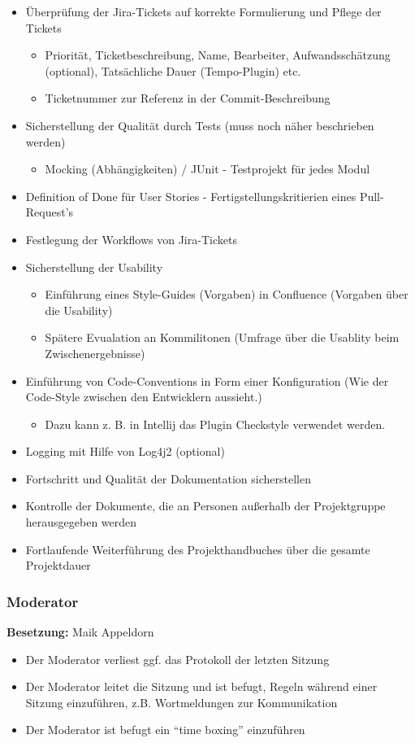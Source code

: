 \begin{itemize}
	\item Überprüfung der Jira-Tickets auf korrekte Formulierung und Pflege der Tickets
	\begin{itemize}
		\item Priorität, Ticketbeschreibung, Name, Bearbeiter, Aufwandsschätzung (optional), Tatsächliche Dauer (Tempo-Plugin) etc.
		\item Ticketnummer zur Referenz in der Commit-Beschreibung
	\end{itemize}
	\item Sicherstellung der Qualität durch Tests (muss noch näher beschrieben werden)
	\begin{itemize}
		\item Mocking (Abhängigkeiten) / JUnit - Testprojekt für jedes Modul
	\end{itemize}
	\item Definition of Done für User Stories - Fertigstellungskritierien eines Pull-Request's
	\item Festlegung der Workflows von Jira-Tickets
	\item Sicherstellung der Usability
	\begin{itemize}
		\item Einführung eines Style-Guides (Vorgaben) in Confluence (Vorgaben über die Usability)
		\item Spätere Evualation an Kommilitonen (Umfrage über die Usablity beim Zwischenergebnisse)
	\end{itemize}
	\item Einführung von Code-Conventions in Form einer Konfiguration (Wie der Code-Style zwischen den Entwicklern aussieht.)
	\begin{itemize}
		\item Dazu kann z. B. in Intellij das Plugin Checkstyle verwendet werden.
	\end{itemize}
	\item Logging mit Hilfe von Log4j2 (optional)
	\item Fortschritt und Qualität der Dokumentation sicherstellen
	\item Kontrolle der Dokumente, die an Personen außerhalb der Projektgruppe herausgegeben werden
	\item Fortlaufende Weiterführung des Projekthandbuches über die gesamte Projektdauer
\end{itemize}

\subsubsection{Moderator}
\textbf{Besetzung:} Maik Appeldorn \\
\begin{itemize}
	\item Der Moderator verliest ggf. das Protokoll der letzten Sitzung
	\item Der Moderator leitet die Sitzung und ist befugt, Regeln während einer Sitzung einzuführen, z.B. Wortmeldungen zur Kommunikation
	\item Der Moderator ist befugt ein "`time boxing"' einzuführen
\end{itemize}

